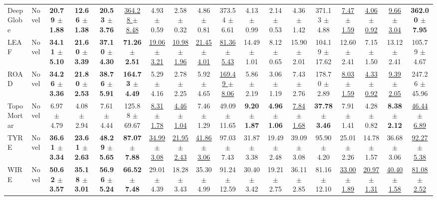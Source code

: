 \begin{table}[t]
{\begin{tabular}{llcccc|cccc|cccc|cccc}
\midrule
DeepGlobe & Novel & \textbf{20.79 $\pm$ 1.88} & \textbf{12.66 $\pm$ 1.38} & \textbf{20.53 $\pm$ 3.76} & \underline{364.28 $\pm$ 8.48} & 4.93 $\pm$ 0.59 & 2.58 $\pm$ 0.32 & 4.86 $\pm$ 0.81 & 373.54 $\pm$ 6.61 & 4.13 $\pm$ 0.99 & 2.14 $\pm$ 0.53 & 4.36 $\pm$ 1.42 & 371.13 $\pm$ 4.88 & \underline{7.47 $\pm$ 1.59} & \underline{4.06 $\pm$ 0.92} & \underline{9.66 $\pm$ 3.04} & \textbf{362.00 $\pm$ 7.95} \\
LEAF & Novel & \textbf{34.11 $\pm$ 5.10} & \textbf{21.60 $\pm$ 3.39} & \textbf{37.10 $\pm$ 4.30} & \textbf{71.26 $\pm$ 2.51} & \underline{19.06 $\pm$ 3.21} & \underline{10.98 $\pm$ 1.96} & \underline{21.45 $\pm$ 4.01} & \underline{81.36 $\pm$ 5.43} & 14.49 $\pm$ 1.01 & 8.12 $\pm$ 0.65 & 15.90 $\pm$ 2.01 & 104.19 $\pm$ 17.62 & 12.60 $\pm$ 2.41 & 7.15 $\pm$ 1.50 & 13.12 $\pm$ 2.41 & 105.79 $\pm$ 4.67 \\
ROAD & Novel & \textbf{34.26 $\pm$ 3.36} & \textbf{21.80 $\pm$ 2.53} & \textbf{38.76 $\pm$ 5.91} & \textbf{164.73 $\pm$ 4.49} & 5.29 $\pm$ 4.16 & 2.78 $\pm$ 2.25 & 5.92 $\pm$ 4.65 & \underline{169.49 $\pm$ 8.06} & 5.86 $\pm$ 2.19 & 3.06 $\pm$ 1.19 & 7.43 $\pm$ 2.76 & 178.70 $\pm$ 2.89 & \underline{8.03 $\pm$ 1.59} & \underline{4.33 $\pm$ 0.92} & \underline{9.39 $\pm$ 2.05} & 247.26 $\pm$ 45.96 \\
TopoMortar & Novel & 6.97 $\pm$ 4.79 & 4.08 $\pm$ 2.94 & 7.61 $\pm$ 4.44 & 125.88 $\pm$ 69.67 & \underline{8.31 $\pm$ 1.78} & \underline{4.46 $\pm$ 1.04} & 7.46 $\pm$ 1.29 & 49.09 $\pm$ 11.65 & \textbf{9.20 $\pm$ 1.87} & \textbf{4.96 $\pm$ 1.06} & \underline{7.84 $\pm$ 1.68} & \textbf{37.78 $\pm$ 3.46} & 7.91 $\pm$ 1.41 & 4.28 $\pm$ 0.82 & \textbf{8.38 $\pm$ 2.12} & \underline{46.44 $\pm$ 6.89} \\
TYRE & Novel & \textbf{36.61 $\pm$ 3.34} & \textbf{23.61 $\pm$ 2.63} & \textbf{48.29 $\pm$ 5.65} & \textbf{87.07 $\pm$ 7.88} & \underline{34.99 $\pm$ 3.08} & \underline{21.95 $\pm$ 2.43} & \underline{41.86 $\pm$ 3.06} & 97.03 $\pm$ 7.43 & 31.87 $\pm$ 3.38 & 19.49 $\pm$ 2.48 & 39.09 $\pm$ 3.08 & 95.90 $\pm$ 4.20 & 25.01 $\pm$ 2.26 & 14.78 $\pm$ 1.57 & 36.68 $\pm$ 3.06 & \underline{92.27 $\pm$ 5.38} \\
WIRE & Novel & \textbf{50.62 $\pm$ 3.57} & \textbf{35.18 $\pm$ 3.01} & \textbf{56.96 $\pm$ 5.24} & \textbf{66.52 $\pm$ 7.48} & 29.01 $\pm$ 4.39 & 18.28 $\pm$ 3.43 & 35.30 $\pm$ 4.99 & 91.24 $\pm$ 12.59 & 30.40 $\pm$ 3.42 & 19.21 $\pm$ 2.75 & 36.11 $\pm$ 2.85 & 81.16 $\pm$ 12.10 & \underline{33.00 $\pm$ 1.89} & \underline{20.97 $\pm$ 1.31} & \underline{40.40 $\pm$ 1.58} & \underline{81.08 $\pm$ 2.52} \\

\end{tabular}}
\end{table}
